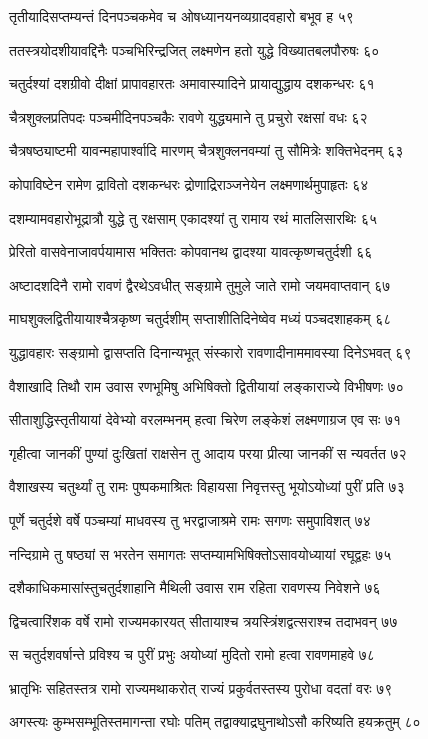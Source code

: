 तृतीयादिसप्तम्यन्तं दिनपञ्चकमेव च
ओषध्यानयनव्यग्रादवहारो बभूव ह ५९

ततस्त्रयोदशीयावद्दिनैः पञ्चभिरिन्द्रजित्
लक्ष्मणेन हतो युद्धे विख्यातबलपौरुषः ६०

चतुर्दश्यां दशग्रीवो दीक्षां प्रापावहारतः
अमावास्यादिने प्रायाद्युद्धाय दशकन्धरः ६१

चैत्रशुक्लप्रतिपदः पञ्चमीदिनपञ्चकैः
रावणे युद्ध्यमाने तु प्रचुरो रक्षसां वधः ६२

चैत्रषष्ठ्याष्टमी यावन्महापार्श्वादि मारणम्
चैत्रशुक्लनवम्यां तु सौमित्रेः शक्तिभेदनम् ६३

कोपाविष्टेन रामेण द्रावितो दशकन्धरः
द्रोणाद्रिराञ्जनेयेन लक्ष्मणार्थमुपाहृतः ६४

दशम्यामवहारोभूद्रात्रौ युद्धे तु रक्षसाम्
एकादश्यां तु रामाय रथं मातलिसारथिः ६५

प्रेरितो वासवेनाजावर्पयामास भक्तितः
कोपवानथ द्वादश्या यावत्कृष्णचतुर्दशी ६६

अष्टादशदिनै रामो रावणं द्वैरथेऽवधीत्
सङ्ग्रामे तुमुले जाते रामो जयमवाप्तवान् ६७

माघशुक्लद्वितीयायाश्चैत्रकृष्ण चतुर्दशीम्
सप्ताशीतिदिनेष्वेव मध्यं पञ्चदशाहकम् ६८

युद्धावहारः सङ्ग्रामो द्वासप्तति दिनान्यभूत्
संस्कारो रावणादीनाममावस्या दिनेऽभवत् ६९

वैशाखादि तिथौ राम उवास रणभूमिषु
अभिषिक्तो द्वितीयायां लङ्काराज्ये विभीषणः ७०

सीताशुद्धिस्तृतीयायां देवेभ्यो वरलम्भनम्
हत्वा चिरेण लङ्केशं लक्ष्मणाग्रज एव सः ७१

गृहीत्वा जानकीं पुण्यां दुःखितां राक्षसेन तु
आदाय परया प्रीत्या जानकीं स न्यवर्तत ७२

वैशाखस्य चतुर्थ्यां तु रामः पुष्पकमाश्रितः
विहायसा निवृत्तस्तु भूयोऽयोध्यां पुरीं प्रति ७३

पूर्णे चतुर्दशे वर्षे पञ्चम्यां माधवस्य तु
भरद्वाजाश्रमे रामः सगणः समुपाविशत् ७४

नन्दिग्रामे तु षष्ठ्यां स भरतेन समागतः
सप्तम्यामभिषिक्तोऽसावयोध्यायां रघूद्वहः ७५

दशैकाधिकमासांस्तुचतुर्दशाहानि मैथिली
उवास राम रहिता रावणस्य निवेशने ७६

द्विचत्वारिंशक वर्षे रामो राज्यमकारयत्
सीतायाश्च त्रयस्त्रिंशद्वत्सराश्च तदाभवन् ७७

स चतुर्दशवर्षान्ते प्रविश्य च पुरीं प्रभुः
अयोध्यां मुदितो रामो हत्वा रावणमाहवे ७८

भ्रातृभिः सहितस्तत्र रामो राज्यमथाकरोत्
राज्यं प्रकुर्वतस्तस्य पुरोधा वदतां वरः ७९

अगस्त्यः कुम्भसम्भूतिस्तमागन्ता रघोः पतिम्
तद्वाक्याद्रघुनाथोऽसौ करिष्यति हयक्रतुम् ८०

